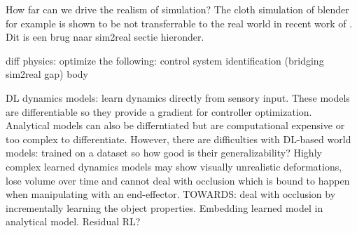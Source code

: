 \documentclass[\home/main.tex]{subfiles}
\begin{document}
How far can we drive the realism of simulation? The cloth simulation of blender for example is shown to be not transferrable to the real world in recent work of \autocite{Tanaka2018}. Dit is een brug naar sim2real sectie hieronder.

diff physics:
    optimize the following:
        control
        system identification  (bridging sim2real gap)
        body 


        DL dynamics models: learn dynamics directly from sensory input. These models are differentiable so they provide a gradient for controller optimization. Analytical models can also be differntiated but are computational expensive or too complex to differentiate. However, there are difficulties with DL-based world models: trained on a dataset so how good is their generalizability? Highly complex learned dynamics models \autocite{Mrowca2018, Li2018} may show visually unrealistic deformations, lose volume over time and cannot deal with occlusion which is bound to happen when manipulating with an end-effector. TOWARDS: deal with occlusion by incrementally learning the object properties. Embedding learned model in analytical model. Residual RL? 
\end{document}
